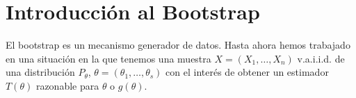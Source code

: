\section{Introducción al Bootstrap}

El bootstrap es un mecanismo generador de datos. Hasta ahora hemos trabajado en una situación en la que tenemos una muestra $X=(X_1,\dots,X_n)$ v.a.i.i.d. de una distribución $P_\theta$, $\theta=(\theta_1,\dots,\theta_s)$ con el interés de obtener un estimador $T(\theta)$ razonable para $\theta$ o $g(\theta)$.\\
